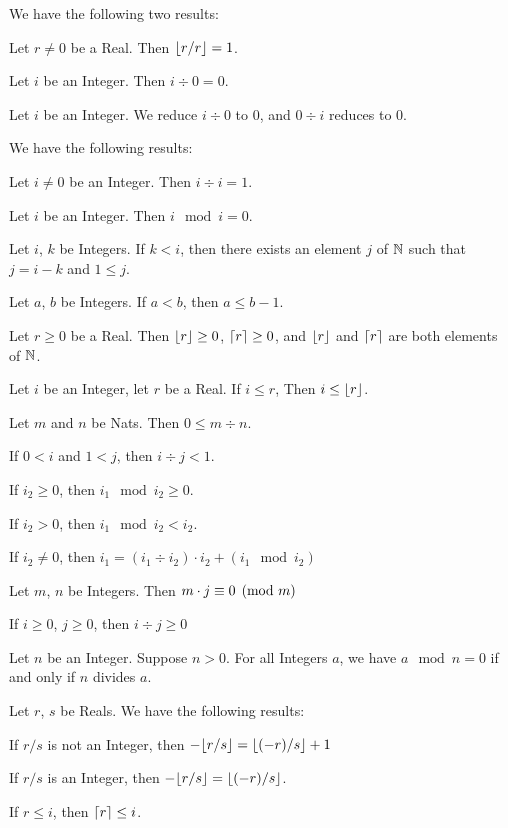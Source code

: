 \documentclass{article}
\begin{document}
We have the following two results:
\begin{thm}
\item\label{int1:47} Let $r\neq0$ be a Real. Then $\lfloor r/r \rfloor=1$.
\item\label{int1:48} Let $i$ be an Integer. Then $i\div0=0$.
\end{thm}

Let $i$ be an Integer. We reduce $i\div0$ to $0$, and $0\div i$ reduces
to $0$.

We have the following results:
\begin{thm}
\item\label{int1:49} Let $i\neq0$ be an Integer. Then $i\div i=1$.
\item\label{int1:50} Let $i$ be an Integer. Then $i\mod{i}=0$.
\item\label{int1:51} Let $i$, $k$ be Integers.
  If $k<i$, then there exists an element $j$ of $\mathbb{N}$ such that $j=i-k$
  and $1\leq j$.
\item\label{int1:52} Let $a$, $b$ be Integers. If $a<b$, then $a\leq b-1$.
\item\label{int1:53} Let $r\geq0$ be a Real. Then $\lfloor r \rfloor\geq0$,
  $\lceil r \rceil\geq0$, and $\lfloor r \rfloor$ and $\lceil r \rceil$ are both elements of $\mathbb{N}$.
\item\label{int1:54} Let $i$ be an Integer, let $r$ be a Real. If $i\leq r$,
  Then $i\leq\lfloor r \rfloor$.
\item\label{int1:55} Let $m$ and $n$ be Nats. Then $0\leq m\div n$.
\item\label{int1:56} If $0<i$ and $1<j$, then $i\div j<1$.
\item\label{int1:57} If $i_{2}\geq0$, then $i_{1}\mod{i_{2}}\geq0$.
\item\label{int1:58} If $i_{2}>0$, then $i_{1}\mod{i_{2}}<i_{2}$.
\item\label{int1:59} If $i_{2}\neq0$, then $i_{1}=(i_{1}\div i_{2})\cdot i_{2} + (i_{1}\mod{i_{2}})$
\item\label{int1:60} Let $m$, $n$ be Integers. Then $m\cdot j\equiv0\pmod{m}$
\item\label{int1:61} If $i\geq0$, $j\geq0$, then $i\div j\geq0$
\item\label{int1:62} Let $n$ be an Integer.
  Suppose $n>0$. For all Integers $a$, we have $a\mod{n}=0$ if and only
  if $n$ divides $a$.
\end{thm}

Let $r$, $s$ be Reals. We have the following results:
\begin{thm}
\item\label{int1:63} If $r/s$ is not an Integer,
  then $-\lfloor r/s \rfloor=\lfloor (-r)/s \rfloor+1$
\item\label{int1:64} If $r/s$ is an Integer,
  then $-\lfloor r/s \rfloor=\lfloor (-r)/s \rfloor$.
\item\label{int1:65} If $r\leq i$, then $\lceil r \rceil\leq i$.
\end{thm}
\end{document}
